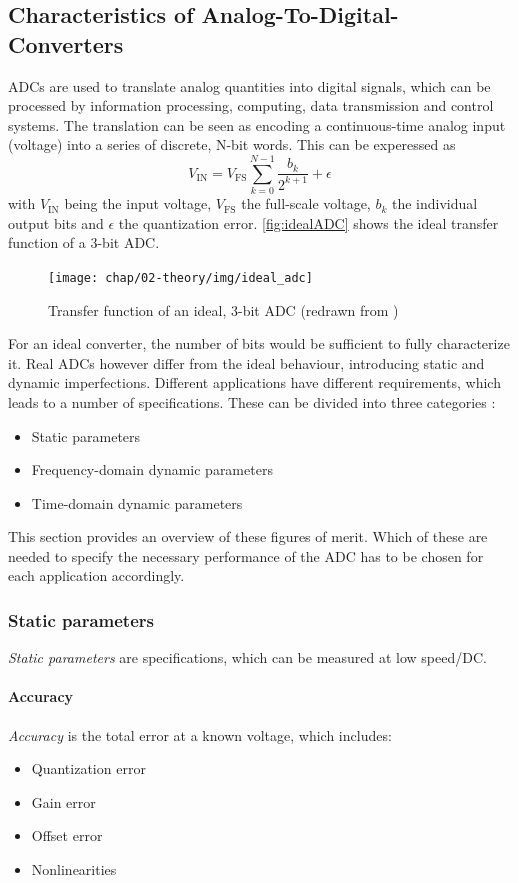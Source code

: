\subsection{Characteristics of Analog-To-Digital-Converters}
ADCs are used to translate analog quantities into digital signals, which can be processed by information processing, computing, data transmission and control systems. The translation can be seen as encoding a continuous-time analog input (voltage) into a series of discrete, N-bit words. This can be experessed as
\begin{equation}
	V_{\text{IN}} = V_{\text{FS}} \sum_{k = 0}^{N-1} \frac{b_k}{2^{k+1}} + \epsilon
\end{equation}
with $V_{\text{IN}}$ being the input voltage, $V_{\text{FS}}$ the full-scale voltage, $b_k$ the individual output bits and $\epsilon$ the quantization error. \autoref{fig:idealADC} shows the ideal transfer function of a 3-bit ADC.
\begin{figure}[H]
	\centering
	\texttt{[image: chap/02-theory/img/ideal\_adc]}
	\caption{Transfer function of an ideal, 3-bit ADC (redrawn from \cite{Lundberg})}
	\label{fig:idealADC}
\end{figure}



For an ideal converter, the number of bits would be sufficient to fully characterize it. Real ADCs however differ from the ideal behaviour, introducing static and dynamic imperfections. Different applications have different requirements, which leads to a number of specifications. These can be divided into three categories \cite{Lundberg}:
\begin{itemize}[noitemsep]
	\item Static parameters
	\item Frequency-domain dynamic parameters
	\item Time-domain dynamic parameters
\end{itemize}
This section provides an overview of these figures of merit. Which of these are needed to specify the necessary performance of the ADC has to be chosen for each application accordingly.

\subsubsection*{Static parameters}
\textit{Static parameters} are specifications, which can be measured at low speed/DC. 
\paragraph{Accuracy}
\textit{Accuracy} is the total error at a known voltage, which includes:
\begin{itemize}[noitemsep]
	\item Quantization error
	\item Gain error
	\item Offset error
	\item Nonlinearities
\end{itemize}

